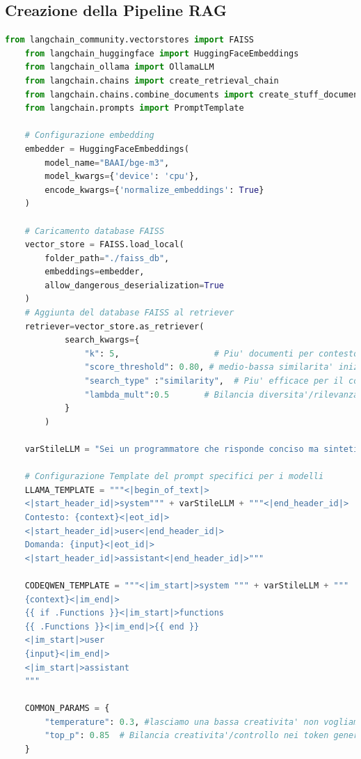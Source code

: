 \documentclass[12pt,a4paper,openright,twoside]{book}
\begin{document}
\subsection{Creazione della Pipeline RAG}
\begin{lstlisting}[language=Python, caption={Pipeline RAG}, label={lst:rag}]
    from langchain_community.vectorstores import FAISS
    from langchain_huggingface import HuggingFaceEmbeddings
    from langchain_ollama import OllamaLLM
    from langchain.chains import create_retrieval_chain
    from langchain.chains.combine_documents import create_stuff_documents_chain
    from langchain.prompts import PromptTemplate
    
    # Configurazione embedding
    embedder = HuggingFaceEmbeddings(
        model_name="BAAI/bge-m3",
        model_kwargs={'device': 'cpu'},
        encode_kwargs={'normalize_embeddings': True}
    )
    
    # Caricamento database FAISS
    vector_store = FAISS.load_local(
        folder_path="./faiss_db",
        embeddings=embedder,
        allow_dangerous_deserialization=True
    )
    # Aggiunta del database FAISS al retriever
    retriever=vector_store.as_retriever(
            search_kwargs={
                "k": 5,                   # Piu' documenti per contesto
                "score_threshold": 0.80, # medio-bassa similarita' inizialmente era 0.90
                "search_type" :"similarity",  # Piu' efficace per il codice
                "lambda_mult":0.5       # Bilancia diversita'/rilevanza
            }
        )
    
    varStileLLM = "Sei un programmatore che risponde conciso ma sintetico."
    
    # Configurazione Template del prompt specifici per i modelli
    LLAMA_TEMPLATE = """<|begin_of_text|>
    <|start_header_id|>system""" + varStileLLM + """<|end_header_id|>
    Contesto: {context}<|eot_id|>
    <|start_header_id|>user<|end_header_id|>
    Domanda: {input}<|eot_id|>
    <|start_header_id|>assistant<|end_header_id|>"""
    
    CODEQWEN_TEMPLATE = """<|im_start|>system """ + varStileLLM + """
    {context}<|im_end|>
    {{ if .Functions }}<|im_start|>functions
    {{ .Functions }}<|im_end|>{{ end }}
    <|im_start|>user
    {input}<|im_end|>
    <|im_start|>assistant
    """
    
    COMMON_PARAMS = {
        "temperature": 0.3, #lasciamo una bassa creativita' non vogliamo che inventi risposte
        "top_p": 0.85  # Bilancia creativita'/controllo nei token generati
    }
    

\end{lstlisting}
\end{document}
